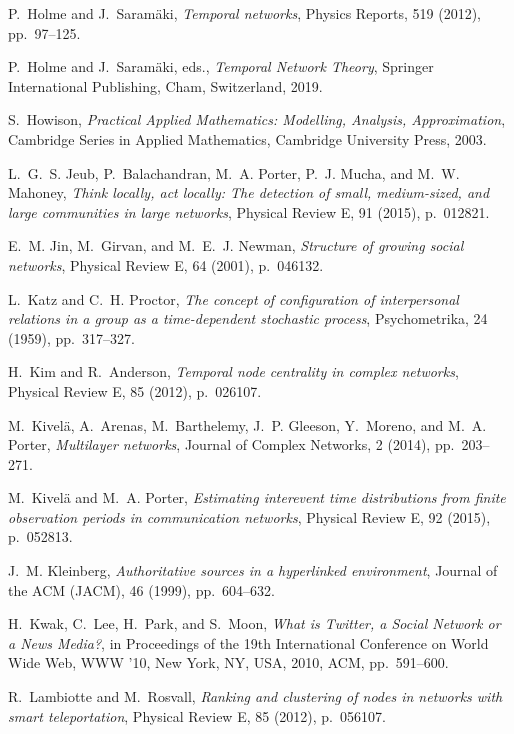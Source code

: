 \documentclass[journal,transmag]{IEEEtran}
\begin{document}
\begin{thebibliography}{10}
{\sc P.~Holme and J.~Saram{\"a}ki}, {\em Temporal networks}, {Physics Reports},
  519 (2012), pp.~97--125.

{\sc P.~Holme and J.~Saram\"{a}ki}, eds., {\em Temporal Network Theory},
  Springer International Publishing, Cham, Switzerland, 2019.

{\sc S.~Howison}, {\em {Practical {A}pplied {M}athematics: {M}odelling,
  {A}nalysis, {A}pproximation}}, Cambridge Series in Applied Mathematics,
  Cambridge University Press, 2003.

{\sc L.~G.~S. Jeub, P.~Balachandran, M.~A. Porter, P.~J. Mucha, and M.~W.
  Mahoney}, {\em Think locally, act locally: The detection of small,
  medium-sized, and large communities in large networks}, Physical Review E, 91
  (2015), p.~012821.

{\sc E.~M. Jin, M.~Girvan, and M.~E.~J. Newman}, {\em Structure of growing
  social networks}, Physical Review E, 64 (2001), p.~046132.

{\sc L.~Katz and C.~H. Proctor}, {\em The concept of configuration of
  interpersonal relations in a group as a time-dependent stochastic process},
  Psychometrika, 24 (1959), pp.~317--327.

{\sc H.~Kim and R.~Anderson}, {\em Temporal node centrality in complex
  networks}, Physical Review E, 85 (2012), p.~026107.

{\sc M.~Kivel{\"a}, A.~Arenas, M.~Barthelemy, J.~P. Gleeson, Y.~Moreno, and
  M.~A. Porter}, {\em Multilayer networks}, {Journal of Complex Networks}, 2
  (2014), pp.~203--271.

{\sc M.~Kivel{\"a} and M.~A. Porter}, {\em Estimating interevent time
  distributions from finite observation periods in communication networks},
  Physical Review E, 92 (2015), p.~052813.

{\sc J.~M. Kleinberg}, {\em Authoritative sources in a hyperlinked
  environment}, Journal of the ACM (JACM), 46 (1999), pp.~604--632.

{\sc H.~Kwak, C.~Lee, H.~Park, and S.~Moon}, {\em {What is Twitter, a Social
  Network or a News Media?}}, in Proceedings of the 19th International
  Conference on World Wide Web, WWW '10, New York, NY, USA, 2010, ACM,
  pp.~591--600.

{\sc R.~Lambiotte and M.~Rosvall}, {\em Ranking and clustering of nodes in
  networks with smart teleportation}, Physical Review E, 85 (2012), p.~056107.


\end{thebibliography}
\end{document}
